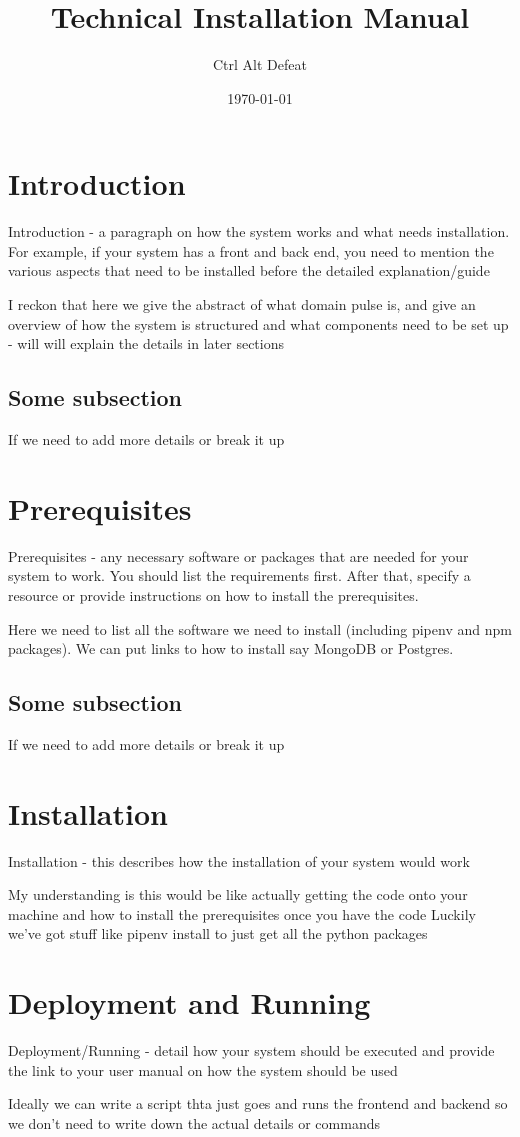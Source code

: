 \documentclass{article}
\title{Technical Installation Manual}
\author{Ctrl Alt Defeat}
\date{\today} %
\begin{document}
\maketitle %


\section{Introduction}
Introduction - a paragraph on how the system works and what needs installation. For example, if your
system has a front and back end, you need to mention the various aspects that need to be installed
before the detailed explanation/guide

I reckon that here we give the abstract of what domain pulse is, and give an overview of how the system is structured
and what components need to be set up - will will explain the details in later sections

\subsection{Some subsection}
If we need to add more details or break it up

\section{Prerequisites}
Prerequisites - any necessary software or packages that are needed for your system to work. You
should list the requirements first. After that, specify a resource or provide instructions on how to
install the prerequisites.

Here we need to list all the software we need to install (including pipenv and npm packages). We can put links to how to install say MongoDB or Postgres.

\subsection{Some subsection}
If we need to add more details or break it up


\section{Installation}
Installation - this describes how the installation of your system would work

My understanding is this would be like actually getting the code onto your machine and how to install the prerequisites once you have the code
Luckily we've got stuff like pipenv install to just get all the python packages


\section{Deployment and Running}
Deployment/Running - detail how your system should be executed and provide the link to your user
manual on how the system should be used

Ideally we can write a script thta just goes and runs the frontend and backend so we don't need to write down the actual details or commands
\end{document}
